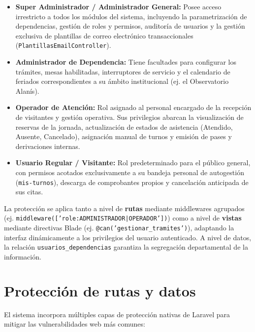\begin{itemize}
    \item \textbf{Super Administrador / Administrador General:} Posee acceso irrestricto a todos los módulos del sistema, incluyendo la parametrización de dependencias, gestión de roles y permisos, auditoría de usuarios y la gestión exclusiva de plantillas de correo electrónico transaccionales (\texttt{PlantillasEmailController}).
    \item \textbf{Administrador de Dependencia:} Tiene facultades para configurar los trámites, mesas habilitadas, interruptores de servicio y el calendario de feriados correspondientes a su ámbito institucional (ej. el Observatorio Alanís).
    \item \textbf{Operador de Atención:} Rol asignado al personal encargado de la recepción de visitantes y gestión operativa. Sus privilegios abarcan la visualización de reservas de la jornada, actualización de estados de asistencia (Atendido, Ausente, Cancelado), asignación manual de turnos y emisión de pases y derivaciones internas.
    \item \textbf{Usuario Regular / Visitante:} Rol predeterminado para el público general, con permisos acotados exclusivamente a su bandeja personal de autogestión (\texttt{mis-turnos}), descarga de comprobantes propios y cancelación anticipada de sus citas.
\end{itemize}

La protección se aplica tanto a nivel de \textbf{rutas} mediante middlewares agrupados (ej. \texttt{middleware(['role:ADMINISTRADOR|OPERADOR'])}) como a nivel de \textbf{vistas} mediante directivas Blade (ej. \texttt{@can('gestionar\_tramites')}), adaptando la interfaz dinámicamente a los privilegios del usuario autenticado. A nivel de datos, la relación \texttt{usuarios\_dependencias} garantiza la segregación departamental de la información.

\section{Protección de rutas y datos}
El sistema incorpora múltiples capas de protección nativas de Laravel para mitigar las vulnerabilidades web más comunes:

